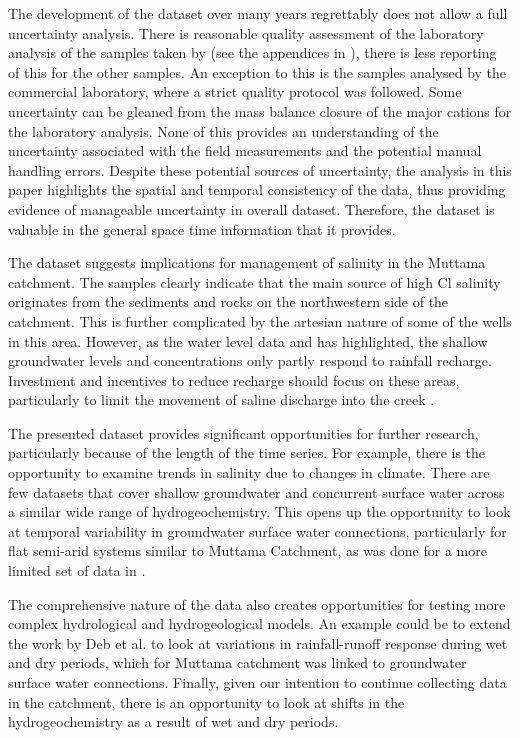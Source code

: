 \documentclass[, manuscript]{copernicus}
\begin{document}
The development of the dataset over many years regrettably does not
allow a full uncertainty analysis. There is reasonable quality
assessment of the laboratory analysis of the samples taken by
\citet{Akter2018} (see the appendices in \citet{Akter2018}), there is
less reporting of this for the other samples. An exception to this is
the samples analysed by the commercial laboratory, where a strict
quality protocol was followed. Some uncertainty can be gleaned from the
mass balance closure of the major cations for the laboratory analysis.
None of this provides an understanding of the uncertainty associated
with the field measurements and the potential manual handling errors.
Despite these potential sources of uncertainty, the analysis in this
paper highlights the spatial and temporal consistency of the data, thus
providing evidence of manageable uncertainty in overall dataset.
Therefore, the dataset is valuable in the general space time information
that it provides.

The dataset suggests implications for management of salinity in the
Muttama catchment. The samples clearly indicate that the main source of
high Cl salinity originates from the sediments and rocks on the
northwestern side of the catchment. This is further complicated by the
artesian nature of some of the wells in this area. However, as the water
level data and \citet{Akter2021} has highlighted, the shallow
groundwater levels and concentrations only partly respond to rainfall
recharge. Investment and incentives to reduce recharge should focus on
these areas, particularly to limit the movement of saline discharge into
the creek \citep{Akter2018}.

The presented dataset provides significant opportunities for further
research, particularly because of the length of the time series. For
example, there is the opportunity to examine trends in salinity due to
changes in climate. There are few datasets that cover shallow
groundwater and concurrent surface water across a similar wide range of
hydrogeochemistry. This opens up the opportunity to look at temporal
variability in groundwater surface water connections, particularly for
flat semi-arid systems similar to Muttama Catchment, as was done for a
more limited set of data in \citet{Akter2018}.

The comprehensive nature of the data also creates opportunities for
testing more complex hydrological and hydrogeological models. An example
could be to extend the work by Deb et al.
\citeyearpar{debMuttamamodel2019} to look at variations in
rainfall-runoff response during wet and dry periods, which for Muttama
catchment was linked to groundwater surface water connections. Finally,
given our intention to continue collecting data in the catchment, there
is an opportunity to look at shifts in the hydrogeochemistry as a result
of wet and dry periods.
\end{document}

